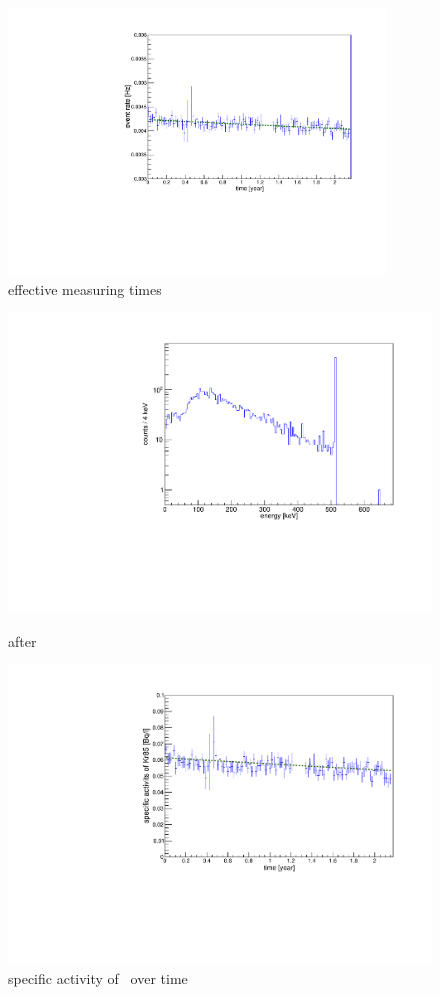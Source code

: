 \documentclass[encoding=utf8,british]{tumphthesis}
\begin{document}
\begin{figure}[t!]
	\centering
	\ifmakefigures%
	\includegraphics[width=100mm]{./Bilder/eventRateFit.pdf}
	\fi%
	\caption{effective measuring times}
	\label{fig:ChangeInEventRateFit}
\end{figure}%
\begin{figure}[t!]
	\centering
	\begin{minipage}{.5\textwidth}
		\centering
		\includegraphics[width=\textwidth]{./Bilder/Sim1Phasenraum.pdf}
		\caption{after}
		\label{fig:Sim1Spektrum}
	\end{minipage}\hfill%
	\begin{minipage}{.5\textwidth}
		\centering
		\includegraphics[width=\textwidth]{./Bilder/Aktivitaet.pdf}
		\caption{specific activity of \Kr\ over time}
		\label{fig:activity}
	\end{minipage}
\end{figure}
\end{document}
